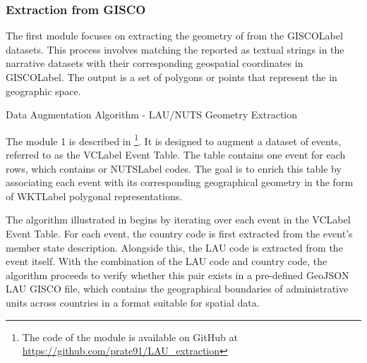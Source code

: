 \subsubsection{Extraction from GISCO}\label{VII-subsubsec:gisco}
The first module focuses on extracting the geometry of  from the \acrshort{GISCOLabel} datasets. This process involves matching the  reported as textual strings in the narrative datasets with their corresponding geospatial coordinates in \acrshort{GISCOLabel}. The output is a set of polygons or points that represent the  in geographic space.


\begin{algorithm}[H]
\caption{Data Augmentation Algorithm - LAU/NUTS Geometry Extraction}
\label{alg:gisco}
\SetAlgoLined
{}
\end{algorithm}

The module 1 is described in \footnote{The code of the module is available on GitHub at \url{https://github.com/prate91/LAU_extraction}}. It is designed to augment a dataset of events, referred to as the \acrshort{VCLabel} Event Table. The table contains one event for each rows, which contains  or \acrfull{NUTSLabel} codes. The goal is to enrich this table by associating each event with its corresponding geographical geometry in the form of \acrshort{WKTLabel} polygonal representations.

The algorithm illustrated in  begins by iterating over each event in the \acrshort{VCLabel} Event Table. For each event, the country code is first extracted from the event's member state description. Alongside this, the LAU code is extracted from the event itself. With the combination of the LAU code and country code, the algorithm proceeds to verify whether this pair exists in a pre-defined GeoJSON LAU GISCO file, which contains the geographical boundaries of administrative units across countries in a format suitable for spatial data.

